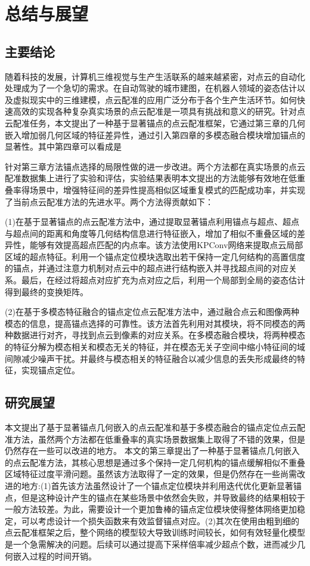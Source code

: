\chapter{总结与展望}
\thispagestyle{others}
\pagestyle{others}
\xiaosi

\section{主要结论}
随着科技的发展，计算机三维视觉与生产生活联系的越来越紧密，对点云的自动化处理成为了一个急切的需求。在自动驾驶的城市建图，在机器人领域的姿态估计以及虚拟现实中的三维建模，点云配准的应用广泛分布于各个生产生活环节。如何快速高效的实现各种复杂真实场景的点云配准是一项具有挑战和意义的研究。针对点云配准任务，本文提出了一种基于显著锚点的点云配准框架，它通过第三章的几何嵌入增加弱几何区域的特征差异性，通过引入第四章的多模态融合模块增加锚点的显著性。其中第四章可以看成是

针对第三章方法锚点选择的局限性做的进一步改进。两个方法都在真实场景的点云配准数据集上进行了实验和评估，实验结果表明本文提出的方法能够有效地在低重叠率得场景中，增强特征间的差异性提高相似区域重复模式的匹配成功率，并实现了当前点云配准方法的先进水平。两个方法得贡献如下：

(1)在基于显著锚点的点云配准方法中，通过提取显著锚点利用锚点与超点、超点与超点间的距离和角度等几何结构信息进行特征嵌入，增加了相似不重叠区域的差异性，能够有效提高超点匹配的内点率。该方法使用KPConv网络来提取点云局部区域的超点特征。利用一个锚点定位模块选取出若干保持一定几何结构的高置信度的锚点，并通过注意力机制对点云中的超点进行结构嵌入并寻找超点间的对应关系。最后，在经过将超点对应扩充为点对应之后，利用一个局部到全局的姿态估计得到最终的变换矩阵。

(2)在基于多模态特征融合的锚点定位点云配准方法中，通过融合点云和图像两种模态的信息，提高锚点选择的可靠性。该方法首先利用对其模块，将不同模态的两种数据进行对齐，寻找到点云到像素的对应关系。在多模态融合模块，将两种模态的特征分解为模态相关和模态无关的特征，并在模态无关子空间中缩小特征间的域间隙减少噪声干扰。并最终与模态相关的特征融合以减少信息的丢失形成最终的特征，实现锚点定位。

\section{研究展望}
本文提出了基于显著锚点几何嵌入的点云配准和基于多模态融合的锚点定位点云配准方法，虽然两个方法都在低重叠率的真实场景数据集上取得了不错的效果，但是仍然存在一些可以改进的地方。
本文的第三章提出了一种基于显著锚点几何嵌入的点云配准方法，其核心思想是通过多个保持一定几何机构的锚点缓解相似不重叠区域特征过度平滑问题。虽然该方法取得了一定的效果，但是仍然存在一些尚需改进的地方:(1)首先该方法虽然设计了一个锚点定位模块并利用迭代优化更新显著锚点，但是这种设计产生的锚点在某些场景中依然会失败，并导致最终的结果相较于一般方法较差。为此，需要设计一个更加鲁棒的锚点定位模块使得整体网络更加稳定，可以考虑设计一个损失函数来有效监督锚点对应。(2)其次在使用由粗到细的点云配准框架之后，整个网络的模型较大导致训练时间较长，如何有效轻量化模型是一个急需解决的问题。后续可以通过提高下采样倍率减少超点个数，进而减少几何嵌入过程的时间开销。

